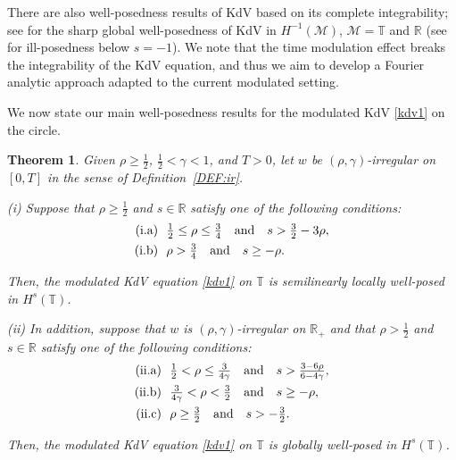\documentclass[letterpaper, 11pt,  reqno]{amsart}
\newtheorem{theorem}{Theorem} [section]
\newcommand{\1}{\hspace{0.5mm}\text{I}\hspace{0.5mm}}
\newcommand{\noi}{\noindent}
\newcommand{\R}{\mathbb{R}}
\newcommand{\T}{\mathbb{T}}
\newcommand{\g}{\gamma}
\newcommand{\M}{\mathcal{M}}
\numberwithin{equation}{section}
\numberwithin{theorem}{section}
\begin{document}
There are also well-posedness results of KdV based on its complete integrability;
see
\cite{KT1,  KV19}
for the sharp global well-posedness of KdV in $H^{-1}(\M)$, $\M = \T$ and $\R$
(see  \cite{M11, M12}
for ill-posedness below $s = -1$).
We note that 
 the time modulation effect 
breaks  the integrability of the KdV equation, 
and thus we aim to develop  a Fourier analytic approach
adapted to the current modulated setting.


\medskip

We now state our main well-posedness
results
for  the modulated KdV \eqref{kdv1} on the circle.




\begin{theorem}\label{THM:1}
Given $\rho \ge\frac 12$,  $\frac12< \g < 1$, and $T> 0$, 
let  $w$ be $(\rho,\g)$-irregular on $[0, T]$ in the sense of Definition~\ref{DEF:ir}.

\smallskip

\noi
\textup{(i)}
Suppose that $\rho \ge \frac 12$ and $s\in \R$
satisfy one of the following conditions\textup{:}
\begin{align}
\begin{split}
\textup{(i.a)} &\ \  \tfrac 12 \le \rho \le \tfrac 34 \quad \text{and} \quad 
s > \tfrac 32 - 3 \rho, \\
\textup{(i.b)} &\ \  \rho > \tfrac 34\quad  \text{and} \quad  s \ge - \rho.
\end{split}
\label{reg1}
\end{align}

\noi
Then, the modulated KdV equation \eqref{kdv1}
on  $\T$
is semilinearly locally well-posed in $H^s(\T)$.



\smallskip

\noi
\textup{(ii)}
In addition, suppose that 
  $w$ is $(\rho,\g)$-irregular on $\R_+$
and  that $\rho > \frac 12$ and $s\in \R$
satisfy one of the following conditions\textup{:}
\begin{align}
\begin{split}
\textup{(ii.a)} &\ \ 
\tfrac 12 < \rho \le \tfrac 3{4\g}
 \quad \text{and} \quad 
s > \tfrac {3- 6\rho}{6-4\g}, \\
\textup{(ii.b)} &\ \ 
\tfrac 3{4 \g}< \rho < \tfrac 32
\quad  \text{and} \quad  s \ge - \rho,\\
\textup{(ii.c)} &\ \ 
  \rho \ge \tfrac 32
\quad  \text{and} \quad 
s  > -\tfrac 32.
\end{split}
\label{s1}
\end{align}



\noi
Then, 
 the modulated KdV equation \eqref{kdv1}
on $\T$
is globally  well-posed in $H^s(\T)$.





\end{theorem}
\end{document}
